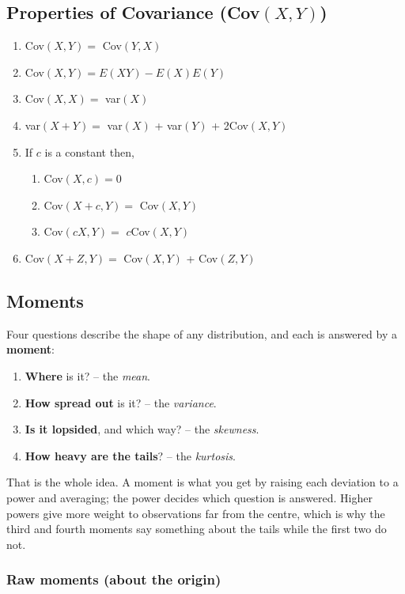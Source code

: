\documentclass[11pt,a4paper]{article}
\theoremstyle{definition}
\begin{document}
\subsection{Properties of Covariance (Cov$(X,Y)$)}
\begin{enumerate}
\item Cov$(X,Y)=$ Cov$(Y,X)$
\item Cov$(X,Y)=E(XY)-E(X)E(Y)$
\item Cov$(X,X)=$ var$(X)$
\item var$(X+Y)=$ var$(X)$ + var$(Y)$ + 2Cov$(X,Y)$ 
\item If $c$ is a constant then,
\begin{enumerate}
      \item Cov$(X,c)=0$
      \item Cov$(X+c,Y)=$ Cov$(X,Y)$
      \item Cov$(cX,Y)=$ $c$Cov$(X,Y)$
\end{enumerate}
\item Cov$(X+Z,Y)=$ Cov$(X,Y)$ + Cov$(Z,Y)$\\
\end{enumerate}


\subsection{Moments}

Four questions describe the shape of any distribution, and each is answered by a
\textbf{moment}:

\begin{enumerate}
\item[1st.] \textbf{Where} is it? -- the \emph{mean}.
\item[2nd.] \textbf{How spread out} is it? -- the \emph{variance}.
\item[3rd.] \textbf{Is it lopsided}, and which way? -- the \emph{skewness}.
\item[4th.] \textbf{How heavy are the tails}? -- the \emph{kurtosis}.
\end{enumerate}

That is the whole idea. A moment is what you get by raising each deviation to a power and
averaging; the power decides which question is answered. Higher powers give more weight to
observations far from the centre, which is why the third and fourth moments say something
about the tails while the first two do not.

\subsubsection{Raw moments (about the origin)}
\end{document}
